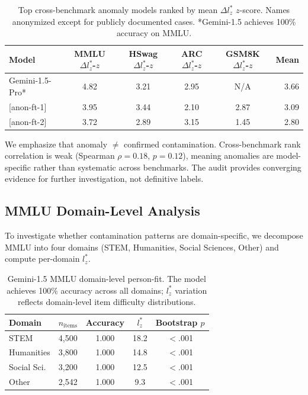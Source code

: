 \documentclass[11pt,a4paper]{article}
\begin{document}
\begin{table}[t]
\centering
\small
\caption{Top cross-benchmark anomaly models ranked by mean $\Delta l_z^*$ $z$-score. Names anonymized except for publicly documented cases. *Gemini-1.5 achieves 100\% accuracy on MMLU.}
\label{tab:top_anomaly}
\begin{tabular}{lccccr}
\toprule
Model & \shortstack{MMLU\\$\Delta l_z^*$-$z$} & \shortstack{HSwag\\$\Delta l_z^*$-$z$} & \shortstack{ARC\\$\Delta l_z^*$-$z$} & \shortstack{GSM8K\\$\Delta l_z^*$-$z$} & Mean \\
\midrule
Gemini-1.5-Pro* & 4.82 & 3.21 & 2.95 & N/A & 3.66 \\
{[anon-ft-1]} & 3.95 & 3.44 & 2.10 & 2.87 & 3.09 \\
{[anon-ft-2]} & 3.72 & 2.89 & 3.15 & 1.45 & 2.80 \\
\bottomrule
\end{tabular}
\end{table}

We emphasize that anomaly $\neq$ confirmed contamination. Cross-benchmark rank correlation is weak (Spearman $\rho=0.18$, $p=0.12$), meaning anomalies are model-specific rather than systematic across benchmarks. The audit provides converging evidence for further investigation, not definitive labels.


\subsection{MMLU Domain-Level Analysis}
\label{sec:domain}

To investigate whether contamination patterns are domain-specific, we decompose MMLU into four domains (STEM, Humanities, Social Sciences, Other) and compute per-domain $l_z^*$.

\begin{table}[t]
\centering
\small
\caption{Gemini-1.5 MMLU domain-level person-fit. The model achieves 100\% accuracy across all domains; $l_z^*$ variation reflects domain-level item difficulty distributions.}
\label{tab:domain}
\begin{tabular}{lcccc}
\toprule
Domain & $n_{\text{items}}$ & Accuracy & $l_z^*$ & Bootstrap $p$ \\
\midrule
STEM & 4{,}500 & 1.000 & 18.2 & $<$.001 \\
Humanities & 3{,}800 & 1.000 & 14.8 & $<$.001 \\
Social Sci. & 3{,}200 & 1.000 & 12.5 & $<$.001 \\
Other & 2{,}542 & 1.000 & 9.3 & $<$.001 \\
\bottomrule
\end{tabular}
\end{table}
\end{document}
